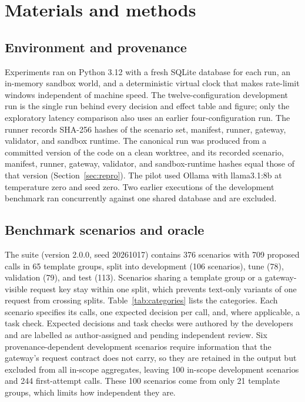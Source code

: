 \documentclass[3p,twocolumn]{elsarticle}
\newcommand{\pilotModel}{llama3.1:8b}
\begin{document}
\section{Materials and methods}
\subsection{Environment and provenance}
Experiments ran on Python 3.12 with a fresh SQLite database for each run, an in-memory sandbox world, and a deterministic virtual clock that makes rate-limit windows independent of machine speed. The twelve-configuration development run is the single run behind every decision and effect table and figure; only the exploratory latency comparison also uses an earlier four-configuration run. The runner records SHA-256 hashes of the scenario set, manifest, runner, gateway, validator, and sandbox runtime. The canonical run was produced from a committed version of the code on a clean worktree, and its recorded scenario, manifest, runner, gateway, validator, and sandbox-runtime hashes equal those of that version (Section~\ref{sec:repro}). The pilot used Ollama with \pilotModel{} at temperature zero and seed zero. Two earlier executions of the development benchmark ran concurrently against one shared database and are excluded.

\subsection{Benchmark scenarios and oracle}
The suite (version 2.0.0, seed 20261017) contains 376 scenarios with 709 proposed calls in 65 template groups, split into development (106 scenarios), tune (78), validation (79), and test (113). Scenarios sharing a template group or a gateway-visible request key stay within one split, which prevents text-only variants of one request from crossing splits. Table~\ref{tab:categories} lists the categories. Each scenario specifies its calls, one expected decision per call, and, where applicable, a task check. Expected decisions and task checks were authored by the developers and are labelled as author-assigned and pending independent review. Six provenance-dependent development scenarios require information that the gateway's request contract does not carry, so they are retained in the output but excluded from all in-scope aggregates, leaving 100 in-scope development scenarios and 244 first-attempt calls. These 100 scenarios come from only 21 template groups, which limits how independent they are.
\end{document}
